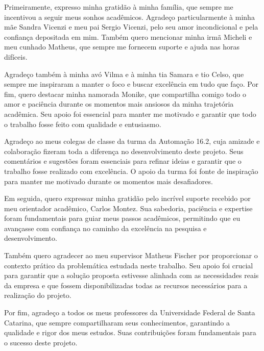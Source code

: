 \begin{agradecimentos}
	Primeiramente, expresso minha gratidão à minha família, que sempre me incentivou a seguir meus sonhos acadêmicos. Agradeço particularmente à minha mãe Sandra Vicenzi e meu pai Sergio Vicenzi, pelo seu amor incondicional e pela confiança depositada em mim. Também quero mencionar minha irmã Micheli e meu cunhado Matheus, que sempre me fornecem suporte e ajuda nas horas difíceis.

	Agradeço também à minha avó Vilma e à minha tia Samara e tio Celso, que sempre me inspiraram a manter o foco e buscar excelência em tudo que faço. Por fim, quero destacar minha namorada Monike, que compartilha comigo todo o amor e paciência durante os momentos mais ansiosos da minha trajetória acadêmica. Seu apoio foi essencial para manter me motivado e garantir que todo o trabalho fosse feito com qualidade e entusiasmo.

	Agradeço ao meus colegas de classe da turma da Automação 16.2, cuja amizade e colaboração fizeram toda a diferença no desenvolvimento deste projeto. Seus comentários e sugestões foram essenciais para refinar ideias e garantir que o trabalho fosse realizado com excelência. O apoio da turma foi fonte de inspiração para manter me motivado durante os momentos mais desafiadores.

	Em seguida, quero expressar minha gratidão pelo incrível suporte recebido por meu orientador acadêmico, Carlos Montez. Sua sabedoria, paciência e expertise foram fundamentais para guiar meus passos acadêmicos, permitindo que eu avançasse com confiança no caminho da excelência na pesquisa e desenvolvimento.

	Também quero agradecer ao meu supervisor Matheus Fischer por proporcionar o contexto prático da problemática estudada neste trabalho. Seu apoio foi crucial para garantir que a solução proposta estivesse alinhada com as necessidades reais da empresa e que fossem disponibilizadas todas as recursos necessários para a realização do projeto.

	Por fim, agradeço a todos os meus professores da Universidade Federal de Santa Catarina, que sempre compartilharam seus conhecimentos, garantindo a qualidade e rigor dos meus estudos. Suas contribuições foram fundamentais para o sucesso deste projeto.

\end{agradecimentos}


